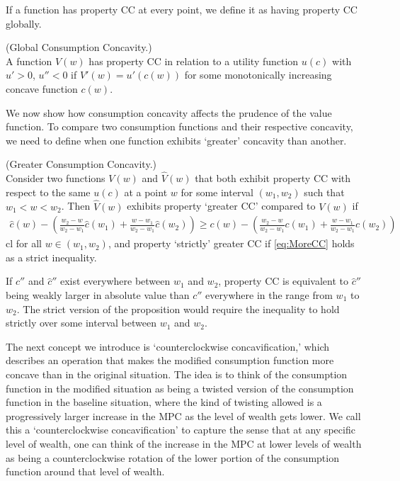 If a function has property CC at every point, we define it as having property CC globally.
\begin{defn}\label{defn:PropCC} (Global Consumption Concavity.) \\  A function $V(w)$ has property CC in relation to a utility function $u(c)$ with $u'>0$, $u''<0$ if $V'(w) = u'(c(w))$ for some monotonically increasing concave function $c(w)$.
\end{defn}

We now show how consumption concavity affects the prudence of the value function. To compare two consumption functions and their respective concavity, we need to define when one function exhibits `greater' concavity than another.

\begin{defn}\label{defn:MoreCC} (Greater Consumption Concavity.) \\ Consider two functions $V(w)$ and $\hat{V}(w)$ that both exhibit property CC with respect to the same $u(c)$ at a point $w$ for some interval $(w_1,w_2)$ such that $w_1 < w < w_2$.  Then $\hat{V}(w)$ exhibits property `greater CC' compared to $V(w)$ if
	\begin{eqnarray}
	\hat{c}(w) - \left(\frac{w_{2}-w}{w_{2}-w_{1}} \hat{c}(w_{1})+\frac{w-w_{1}}{w_{2}-w_{1}}\hat{c}(w_{2})\right) \geq c(w) - \left(\frac{w_{2}-w}{w_{2}-w_{1}} c(w_{1})+\frac{w-w_{1}}{w_{2}-w_{1}}c(w_{2})\right) \label{eq:MoreCC}
	\end{eqnarray}
        cl	for all $w \in (w_{1},w_{2})$, and property `strictly' greater CC if \eqref{eq:MoreCC}
	holds as a strict inequality.
\end{defn}

If $c''$ and $\hat{c}''$ exist everywhere between $w_1$ and $w_2$, property CC is equivalent to $\hat{c}''$ being weakly larger in absolute value than $c''$ everywhere in the range from $w_1$ to $w_2$. The strict version of the proposition would require the inequality to hold strictly over some interval between $w_1$ and $w_2$.

The next concept we introduce is `counterclockwise concavification,' which describes an operation that makes the modified consumption function more concave than in the original situation. The idea is to think of the consumption function in the modified situation as being a twisted version of the consumption function in the baseline situation, where the kind of twisting allowed is a progressively larger increase in the MPC as the level of wealth gets lower. We call this a `counterclockwise concavification' to capture the sense that at any specific level of wealth, one can think of the increase in the MPC at lower levels of wealth as being a counterclockwise rotation of the lower portion of the consumption function around that level of wealth.

